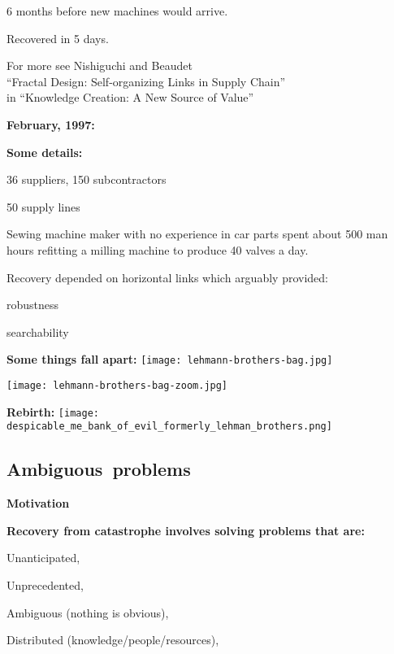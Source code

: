       6 months before new machines would arrive.
     
      {
        Recovered in 5 days.}
    
  

  
   
    For more see Nishiguchi and Beaudet\cite{nishiguchi2000a}\\
    ``Fractal Design: Self-organizing Links in Supply Chain''\\
    in ``Knowledge Creation: A New Source of Value''
  
  


  \textbf{February, 1997:}

  \textbf{Some details:}
    
    
      36 suppliers, 150 subcontractors
     
      50 supply lines
     
      Sewing machine maker with no experience in car parts
      spent about 500 man hours refitting a milling machine
      to produce 40 valves a day.
    
      Recovery depended on horizontal links which
      arguably provided:
      
       
        robustness
      
        searchability
      
    
  


  \textbf{Some things fall apart:}
  \texttt{[image: lehmann-brothers-bag.jpg]}

  \texttt{[image: lehmann-brothers-bag-zoom.jpg]}

  \textbf{Rebirth:}
  \texttt{[image: despicable\_me\_bank\_of\_evil\_formerly\_lehman\_brothers.png]}

\subsection{Ambiguous\ problems}

  \textbf{Motivation}

  \textbf{Recovery from catastrophe involves solving problems that are:}
    
     
      Unanticipated,
     
      Unprecedented,
    
      Ambiguous (nothing is obvious),
     
      Distributed (knowledge/people/resources),
     
